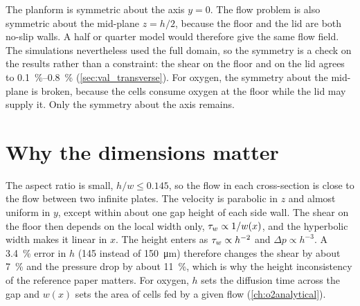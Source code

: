 The planform is symmetric about the axis $y=0$. The flow problem is also symmetric about the mid-plane $z=h/2$, because the floor and the lid are both no-slip walls. A half or quarter model would therefore give the same flow field. The simulations nevertheless used the full domain, so the symmetry is a check on the results rather than a constraint: the shear on the floor and on the lid agrees to \SIrange{0.1}{0.8}{\percent} (\cref{sec:val_transverse}). For oxygen, the symmetry about the mid-plane is broken, because the cells consume oxygen at the floor while the lid may supply it. Only the symmetry about the axis remains.

\section{Why the dimensions matter}

The aspect ratio is small, $h/w\le0.145$, so the flow in each cross-section is close to the flow between two infinite plates. The velocity is parabolic in $z$ and almost uniform in $y$, except within about one gap height of each side wall. The shear on the floor then depends on the local width only, $\tau_{w}\propto1/w(x)$, and the hyperbolic width makes it linear in $x$. The height enters as $\tau_{w}\propto h^{-2}$ and $\Delta p\propto h^{-3}$. A \SI{3.4}{\percent} error in $h$ (\SI{145}{} instead of \SI{150}{\micro\metre}) therefore changes the shear by about \SI{7}{\percent} and the pressure drop by about \SI{11}{\percent}, which is why the height inconsistency of the reference paper matters. For oxygen, $h$ sets the diffusion time across the gap and $w(x)$ sets the area of cells fed by a given flow (\cref{ch:o2analytical}).
